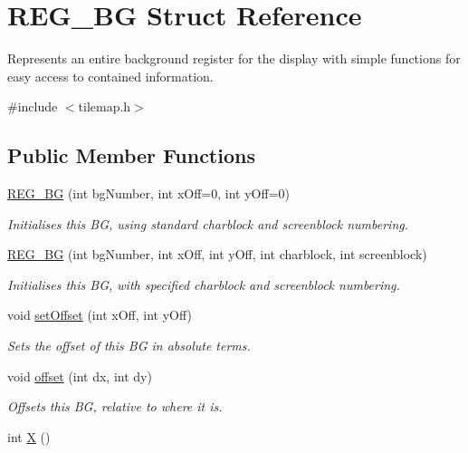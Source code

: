 \hypertarget{struct_r_e_g___b_g}{\section{R\-E\-G\-\_\-\-B\-G Struct Reference}
\label{struct_r_e_g___b_g}
}


Represents an entire background register for the display with simple functions for easy access to contained information.  




{\ttfamily \#include $<$tilemap.\-h$>$}

\subsection*{Public Member Functions}
\begin{DoxyCompactItemize}
\item 
\hyperlink{struct_r_e_g___b_g_a9b51fd4ac8e9235a5d2edd4f8e9afb55}{R\-E\-G\-\_\-\-B\-G} (int bg\-Number, int x\-Off=0, int y\-Off=0)
\begin{DoxyCompactList}\small\item\em Initialises this B\-G, using standard charblock and screenblock numbering. \end{DoxyCompactList}\item 
\hyperlink{struct_r_e_g___b_g_a9455b73581d6fa020fd374ce66ae4fae}{R\-E\-G\-\_\-\-B\-G} (int bg\-Number, int x\-Off, int y\-Off, int charblock, int screenblock)
\begin{DoxyCompactList}\small\item\em Initialises this B\-G, with specified charblock and screenblock numbering. \end{DoxyCompactList}\item 
void \hyperlink{struct_r_e_g___b_g_a86e916e2b8d11a9c365ff36ee26b6608}{set\-Offset} (int x\-Off, int y\-Off)
\begin{DoxyCompactList}\small\item\em Sets the offset of this B\-G in absolute terms. \end{DoxyCompactList}\item 
void \hyperlink{struct_r_e_g___b_g_a84b41c1f3a19dbdf20364f11a49f6b31}{offset} (int dx, int dy)
\begin{DoxyCompactList}\small\item\em Offsets this B\-G, relative to where it is. \end{DoxyCompactList}\item 
\hypertarget{struct_r_e_g___b_g_a8fb9190f13de2741ae495950725efdf3}{int \hyperlink{struct_r_e_g___b_g_a8fb9190f13de2741ae495950725efdf3}{X} ()}\label{struct_r_e_g___b_g_a8fb9190f13de2741ae495950725efdf3}


\end{DoxyCompactItemize}
